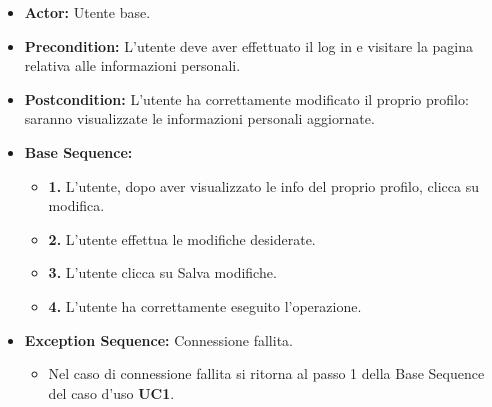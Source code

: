 \begin{itemize}
    \item \textbf{Actor:} Utente base.
    \item \textbf{Precondition:} L'utente deve aver effettuato il log in e visitare la pagina relativa alle informazioni personali.
    \item \textbf{Postcondition:} L'utente ha correttamente modificato il proprio profilo: saranno visualizzate le informazioni personali aggiornate.
    \item \textbf{Base Sequence:}
    \begin{itemize}
        \item \textbf{1.} L'utente, dopo aver visualizzato le info del proprio profilo, clicca su modifica.
        \item \textbf{2.} L'utente effettua le modifiche desiderate.
        \item \textbf{3.} L'utente clicca su Salva modifiche.
        \item \textbf{4.} L'utente ha correttamente eseguito l'operazione.
    \end{itemize}
    \item \textbf{Exception Sequence:} Connessione fallita.
    \begin{itemize}
        \item Nel caso di connessione fallita si ritorna al passo 1 della Base Sequence del caso d'uso \textbf{UC1}.
    \end{itemize}
\end{itemize}
\vspace{1cm}

